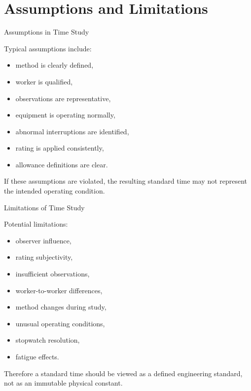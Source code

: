 \documentclass[aspectratio=169,10pt]{beamer}
\begin{document}

\section{Assumptions and Limitations}

\begin{frame}[shrink=18]{Assumptions in Time Study}
\small

Typical assumptions include:

\begin{itemize}
    \item method is clearly defined,
    \item worker is qualified,
    \item observations are representative,
    \item equipment is operating normally,
    \item abnormal interruptions are identified,
    \item rating is applied consistently,
    \item allowance definitions are clear.
\end{itemize}

\vspace{5pt}

If these assumptions are violated, the resulting standard time may
not represent the intended operating condition.

\end{frame}


\begin{frame}[shrink=18]{Limitations of Time Study}
\small

Potential limitations:

\begin{itemize}
    \item observer influence,
    \item rating subjectivity,
    \item insufficient observations,
    \item worker-to-worker differences,
    \item method changes during study,
    \item unusual operating conditions,
    \item stopwatch resolution,
    \item fatigue effects.
\end{itemize}

Therefore a standard time should be viewed as a defined engineering
standard, not as an immutable physical constant.

\end{frame}
\end{document}
